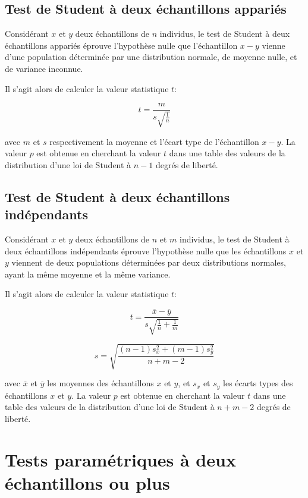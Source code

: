 \subsection{Test de Student à deux échantillons appariés}

Considérant $x$ et $y$ deux échantillons de $n$ individus, le test de Student à deux échantillons appariés éprouve l'hypothèse nulle que l'échantillon $x-y$ vienne d'une population déterminée par une distribution normale, de moyenne nulle, et de variance inconnue.

Il s'agit alors de calculer la valeur statistique $t$:

\begin{equation}
t=\dfrac{m}{s\sqrt{\frac{1}{n}}}
\end{equation}

avec $m$ et $s$ respectivement la moyenne et l'écart type de l'échantillon $x-y$. La valeur $p$ est obtenue en cherchant la valeur $t$ dans une table des valeurs de la distribution d'une loi de Student à $n-1$ degrés de liberté.

\subsection{Test de Student à deux échantillons indépendants}

Considérant $x$ et $y$ deux échantillons de $n$ et $m$ individus, le test de Student à deux échantillons indépendants éprouve l'hypothèse nulle que les échantillons $x$ et $y$ viennent de deux populations déterminées par deux distributions normales, ayant la même moyenne et la même variance.

Il s'agit alors de calculer la valeur statistique $t$:

\begin{equation}
t=\dfrac{\overline{x}-\overline{y}}{s\sqrt{\frac{1}{n}+\frac{1}{m}}}
\end{equation}

\begin{equation}
s=\sqrt{\dfrac{(n-1)s^2_x + (m-1)s^2_y}{n+m-2}}
\end{equation}

avec $\overline{x}$ et $\overline{y}$ les moyennes des échantillons $x$ et $y$, et $s_x$ et $s_y$ les écarts types des échantillons $x$ et $y$. La valeur $p$ est obtenue en cherchant la valeur $t$ dans une table des valeurs de la distribution d'une loi de Student à $n+m-2$ degrés de liberté.

\section{Tests paramétriques à deux échantillons ou plus}
\label{app:anova}


